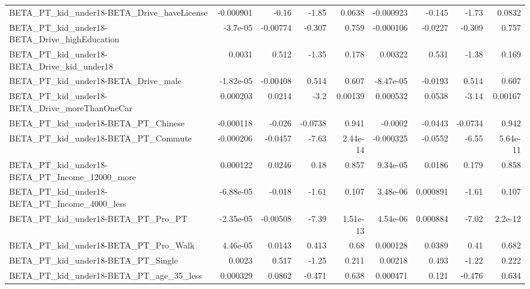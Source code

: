 \begin{tabular}{lrrrrrrrr}
BETA\_PT\_kid\_under18-BETA\_Drive\_haveLicense         &   -0.000901 &        -0.16 &     -1.85 &   0.0638 &  -0.000923 &      -0.145 &        -1.73 &        0.0832 \\
BETA\_PT\_kid\_under18-BETA\_Drive\_highEducation       &    -3.7e-05 &     -0.00774 &    -0.307 &    0.759 &  -0.000106 &     -0.0227 &       -0.309 &         0.757 \\
BETA\_PT\_kid\_under18-BETA\_Drive\_kid\_under18         &      0.0031 &        0.512 &     -1.35 &    0.178 &    0.00322 &       0.531 &        -1.38 &         0.169 \\
BETA\_PT\_kid\_under18-BETA\_Drive\_male                &   -1.82e-05 &     -0.00408 &     0.514 &    0.607 &  -8.47e-05 &     -0.0193 &        0.514 &         0.607 \\
BETA\_PT\_kid\_under18-BETA\_Drive\_moreThanOneCar      &    0.000203 &       0.0214 &      -3.2 &  0.00139 &   0.000532 &      0.0538 &        -3.14 &       0.00167 \\
BETA\_PT\_kid\_under18-BETA\_PT\_Chinese                &   -0.000118 &       -0.026 &   -0.0738 &    0.941 &    -0.0002 &     -0.0443 &      -0.0734 &         0.942 \\
BETA\_PT\_kid\_under18-BETA\_PT\_Commute                &   -0.000206 &      -0.0457 &     -7.63 & 2.44e-14 &  -0.000325 &     -0.0552 &        -6.55 &      5.64e-11 \\
BETA\_PT\_kid\_under18-BETA\_PT\_Income\_12000\_more      &    0.000122 &       0.0246 &      0.18 &    0.857 &   9.34e-05 &      0.0186 &        0.179 &         0.858 \\
BETA\_PT\_kid\_under18-BETA\_PT\_Income\_4000\_less       &   -6.88e-05 &       -0.018 &     -1.61 &    0.107 &   3.48e-06 &    0.000891 &        -1.61 &         0.107 \\
BETA\_PT\_kid\_under18-BETA\_PT\_Pro\_PT                 &   -2.35e-05 &     -0.00508 &     -7.39 & 1.51e-13 &   4.54e-06 &    0.000884 &        -7.02 &       2.2e-12 \\
BETA\_PT\_kid\_under18-BETA\_PT\_Pro\_Walk               &    4.46e-05 &       0.0143 &     0.413 &     0.68 &   0.000128 &      0.0389 &         0.41 &         0.682 \\
BETA\_PT\_kid\_under18-BETA\_PT\_Single                 &      0.0023 &        0.517 &     -1.25 &    0.211 &    0.00218 &       0.493 &        -1.22 &         0.222 \\
BETA\_PT\_kid\_under18-BETA\_PT\_age\_35\_less            &    0.000329 &       0.0862 &    -0.471 &    0.638 &   0.000471 &       0.121 &       -0.476 &         0.634 \\

\end{tabular}

